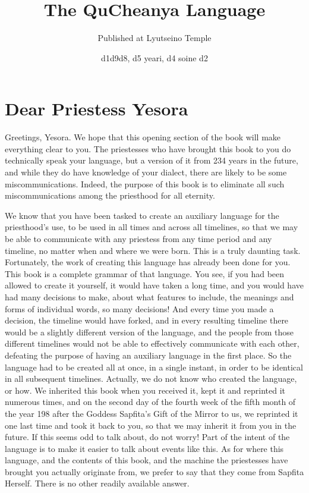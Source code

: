 \documentclass{article}
\title{The QuCheanya Language}
\date{{\quch d1d9d8, d5 yeari, d4 soine d2}}
\author{Published at Lyutseino Temple}
\begin{document}
\newcommand{\entry}[3]{{\quch #1}\ \textit{#2}\ $\bullet$\ {#3}}
\newcommand{\scap}[1]{{\smaller #1}}
\newcommand{\scaptwo}[2]{{\smaller #1}.{\smaller #2}}
\newcommand{\scapthree}[3]{{\smaller #1}.{\smaller #2}.{\smaller #3}}
\newlanguage\quchlanguage
\newcommand{\quch}[1]{\huge\language\quchlanguage\qucheanya #1}
\newcommand{\quchspace}{\phantom{\quch t}}

\maketitle
\tableofcontents \newpage

\part{Dear Priestess Yesora}
Greetings, Yesora.  We hope that this opening section of the book will make everything clear to you.  The priestesses who have brought this book to you do technically speak your language, but a version of it from 234 years in the future, and while they do have knowledge of your dialect, there are likely to be some miscommunications.  Indeed, the purpose of this book is to eliminate all such miscommunications among the priesthood for all eternity.

We know that you have been tasked to create an auxiliary language for the priesthood's use, to be used in all times and across all timelines, so that we may be able to communicate with any priestess from any time period and any timeline, no matter when and where we were born.  This is a truly daunting task.  Fortunately, the work of creating this language has already been done for you.  This book is a complete grammar of that language.  You see, if you had been allowed to create it yourself, it would have taken a long time, and you would have had many decisions to make, about what features to include, the meanings and forms of individual words, so many decisions!  And every time you made a decision, the timeline would have forked, and in every resulting timeline there would be a slightly different version of the language, and the people from those different timelines would not be able to effectively communicate with each other, defeating the purpose of having an auxiliary language in the first place.  So the language had to be created all at once, in a single instant, in order to be identical in all subsequent timelines.  Actually, we do not know who created the language, or how.  We inherited this book when you received it, kept it and reprinted it numerous times, and on the second day of the fourth week of the fifth month of the year 198 after the Goddess Sapfita's Gift of the Mirror to us, we reprinted it one last time and took it back to you, so that we may inherit it from you in the future.  If this seems odd to talk about, do not worry!  Part of the intent of the language is to make it easier to talk about events like this.  As for where this language, and the contents of this book, and the machine the priestesses have brought you actually originate from, we prefer to say that they come from Sapfita Herself.  There is no other readily available answer.
\end{document}
